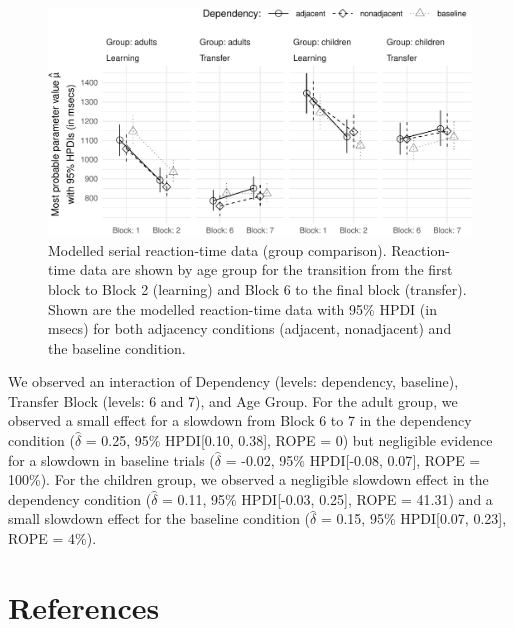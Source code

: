 \documentclass[
  english,
  man,floatsintext]{apa7}
\begin{document}
\begin{figure}[ht]

{\centering \includegraphics{Group-comparison_v2_files/figure-latex/plotgroupcomp-1} 

}

\caption{Modelled serial reaction-time data (group comparison). Reaction-time data are shown by age group for the transition from the first block to Block 2 (learning) and Block 6 to the final block (transfer). Shown are the modelled reaction-time data with 95\% HPDI (in msecs) for both adjacency conditions (adjacent, nonadjacent) and the baseline condition.}\label{fig:plotgroupcomp}
\end{figure}

We observed an interaction of Dependency (levels: dependency, baseline), Transfer Block (levels: 6 and 7), and Age Group. For the adult group, we observed a small effect for a slowdown from Block 6 to 7 in the dependency condition (\(\hat{\delta}\) = 0.25, 95\% HPDI{[}0.10, 0.38{]}, ROPE = 0) but negligible evidence for a slowdown in baseline trials (\(\hat{\delta}\) = -0.02, 95\% HPDI{[}-0.08, 0.07{]}, ROPE = 100\%). For the children group, we observed a negligible slowdown effect in the dependency condition (\(\hat{\delta}\) = 0.11, 95\% HPDI{[}-0.03, 0.25{]}, ROPE = 41.31) and a small slowdown effect for the baseline condition (\(\hat{\delta}\) = 0.15, 95\% HPDI{[}0.07, 0.23{]}, ROPE = 4\%).

\newpage

\hypertarget{references}{%
\section{References}\label{references}}

\begingroup
\setlength{\parindent}{-0.5in}
\setlength{\leftskip}{0.5in}
\end{document}
